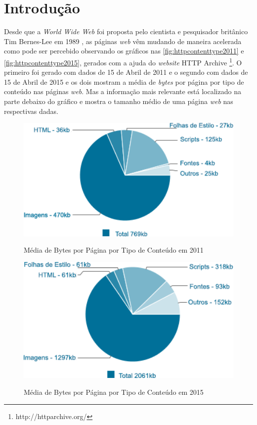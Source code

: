 %
%

\chapter{Introdução}\label{chap:introducao}

Desde que a \textit{World Wide Web} foi proposta pelo cientista e pesquisador britânico Tim Bernes-Lee em 1989 \cite{WebHistory}, as páginas \textit{web} vêm mudando de maneira acelerada como pode ser percebido observando os gráficos nas \autoref{fig:httpcontenttype2011} e \autoref{fig:httpcontenttype2015}, gerados com a ajuda do \textit{website} HTTP Archive \footnote{http://httparchive.org/}. O primeiro foi gerado com dados de 15 de Abril de 2011 e o segundo com dados de 15 de Abril de 2015 e os dois mostram a média de \textit{bytes} por página por tipo de conteúdo nas páginas \textit{web}. Mas a informação mais relevante está localizado na parte debaixo do gráfico e mostra o tamanho médio de uma página \textit{web} nas respectivas dadas.

\begin{figure}[!htb]
    \centering
    \caption{Média de Bytes por Página por Tipo de Conteúdo em 2011}
    \includegraphics[width=1.0\textwidth]{./04-figuras/introducao/bytes_content_type_april_2011}
    \label{fig:httpcontenttype2011}
\end{figure}

\begin{figure}[!htb]
    \centering
    \caption{Média de Bytes por Página por Tipo de Conteúdo em 2015}
    \includegraphics[width=1.0\textwidth]{./04-figuras/introducao/bytes_content_type_april_2015}
    \label{fig:httpcontenttype2015}
\end{figure}

